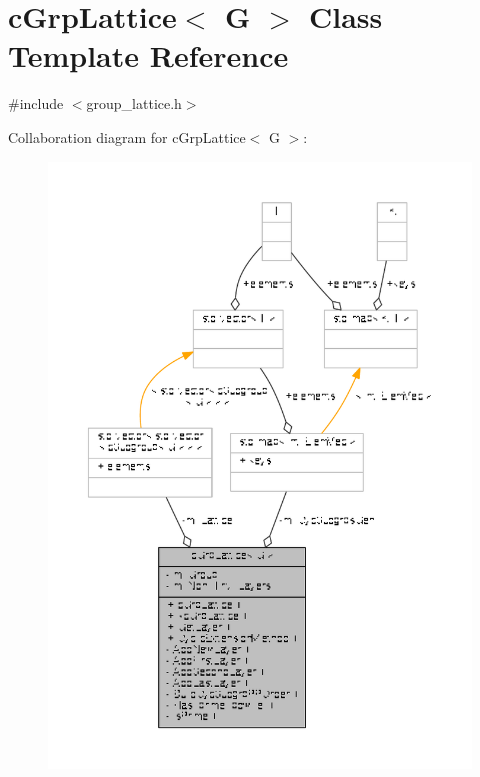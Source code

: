 \hypertarget{classcGrpLattice}{\section{c\-Grp\-Lattice$<$ G $>$ Class Template Reference}
\label{classcGrpLattice}
}


{\ttfamily \#include $<$group\-\_\-lattice.\-h$>$}



Collaboration diagram for c\-Grp\-Lattice$<$ G $>$\-:
\nopagebreak
\begin{figure}[H]
\begin{center}
\leavevmode
\includegraphics[width=350pt]{classcGrpLattice__coll__graph}
\end{center}
\end{figure}
